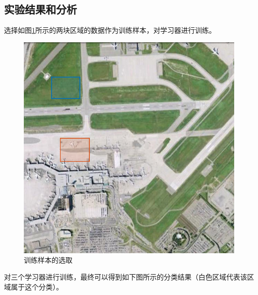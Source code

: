 \subsection{实验结果和分析}
选择如图\ref{fig:airport_44_samples}所示的两块区域的数据作为训练样本，对学习器进行训练。
\begin{figure}[H]
	\centering
	\includegraphics[width=0.7\linewidth]{figure/airport_44_Ensemble_Learning_Training_Set.png}
	\caption{训练样本的选取}
	\label{fig:airport_44_samples}
\end{figure}
对三个学习器进行训练，最终可以得到如下图所示的分类结果（白色区域代表该区域属于这个分类）。
